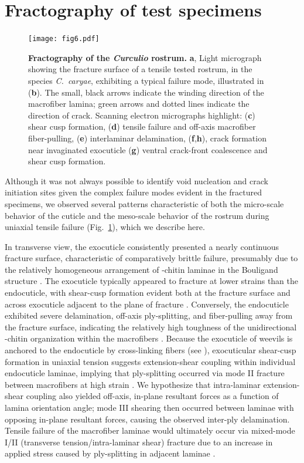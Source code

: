 \documentclass[twocolumn, linenumbers, superscriptaddress, nofootinbib]{revtex4-1}
\begin{document}
	\section{Fractography of test specimens}
		
		\begin{figure}
			\centering
			\texttt{[image: fig6.pdf]}
			\caption{\textbf{Fractography of the \textit{Curculio} rostrum.}
				\textbf{a}, Light micrograph showing the fracture surface of a tensile tested rostrum, in the species \textit{C.~caryae}, exhibiting a typical failure mode, illustrated in (\textbf{b}).
				The small, black arrows indicate the winding direction of the macrofiber lamina; green arrows and dotted lines indicate the direction of crack.
				Scanning electron micrographs highlight: (\textbf{c}) shear cusp formation, (\textbf{d}) tensile failure and off-axis macrofiber fiber-pulling, (\textbf{e}) interlaminar delamination, (\textbf{f},\textbf{h}), crack formation near invaginated exocuticle (\textbf{g}) ventral crack-front coalescence and shear cusp formation.
			}
			\label{fig::fracture}
		\end{figure}
		
		Although it was not always possible to identify void nucleation and crack initiation sites given the complex failure modes evident in the fractured specimens, we observed several patterns characteristic of both the micro-scale behavior of the cuticle and the meso-scale behavior of the rostrum during uniaxial tensile failure (Fig.~\ref{fig::fracture}), which we describe here.
		
		In transverse view, the exocuticle consistently presented a nearly continuous fracture surface, characteristic of comparatively brittle failure, presumably due to the relatively homogeneous arrangement of \textalpha-chitin laminae in the Bouligand structure \cite{Nikolov2010, Nikolov2011}.
		The exocuticle typically appeared to fracture at lower strains than the endocuticle, with shear-cusp formation evident both at the fracture surface and across exocuticle adjacent to the plane of fracture \cite{Greenhalgh2009}.
		Conversely, the endocuticle exhibited severe delamination, off-axis ply-splitting, and fiber-pulling away from the fracture surface, indicating the relatively high toughness of the unidirectional \textalpha-chitin organization within the macrofibers \cite{Kamp2010, Kamp2015}.
		Because the exocuticle of weevils is anchored to the endocuticle by cross-linking fibers (see \cite{Kamp2015, Longhai2017}), exocuticular shear-cusp formation in uniaxial tension suggests extension-shear coupling within individual endocuticle laminae, implying that ply-splitting occurred via mode II fracture between macrofibers at high strain \cite{Jones2014, Reddy2004}.
		We hypothesize that intra-laminar extension-shear coupling also yielded off-axis, in-plane resultant forces as a function of lamina orientation angle; mode III shearing then occurred between laminae with opposing in-plane resultant forces, causing the observed inter-ply delamination.
		Tensile failure of the macrofiber laminae would ultimately occur via mixed-mode I/II (transverse tension/intra-laminar shear) fracture due to an increase in applied stress caused by ply-splitting in adjacent laminae \cite{Greenhalgh2009}.
		
\end{document}
